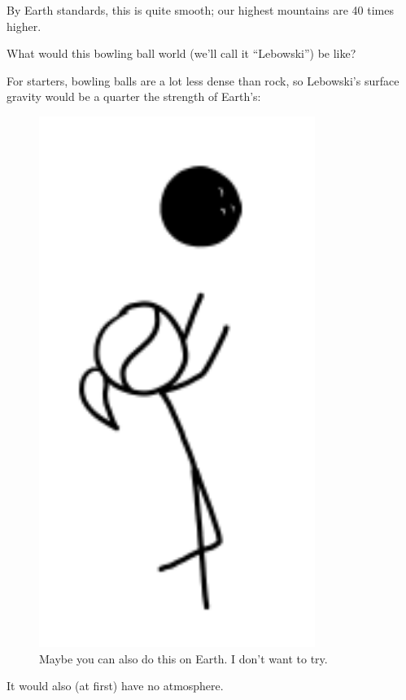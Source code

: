 {{By Earth standards, this is quite smooth; our highest mountains are 40 times higher.}

{What would this bowling ball world (we’ll call it “Lebowski”) be like?}

{For starters, bowling balls are a lot less dense than rock, so Lebowski’s surface gravity would be a quarter the strength of Earth’s:}

\begin{figure}[!htbp]
\centering
\includegraphics[scale=0.5, max width=0.8\textwidth]{imgs/a/46/bowling_throw.png}
\caption{Maybe you can also do this on Earth. I don’t want to try.}
\end{figure}

{It would also (at first) have no atmosphere.}

}
